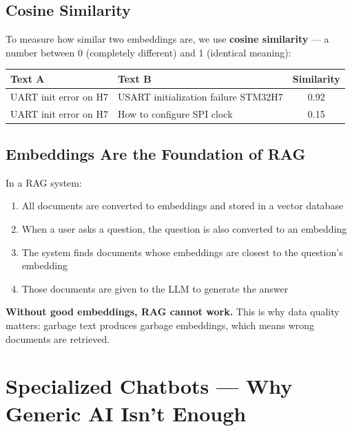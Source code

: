 \documentclass[11pt,a4paper]{report}
\begin{document}
\section{Cosine Similarity}

To measure how similar two embeddings are, we use \textbf{cosine similarity} --- a number between 0 (completely different) and 1 (identical meaning):

\begin{table}[h]
\centering
\begin{tabularx}{\textwidth}{X X c}
\toprule
\textbf{Text A} & \textbf{Text B} & \textbf{Similarity} \\
\midrule
UART init error on H7 & USART initialization failure STM32H7 & 0.92 \\
UART init error on H7 & How to configure SPI clock & 0.15 \\
\bottomrule
\end{tabularx}
\end{table}

\section{Embeddings Are the Foundation of RAG}

In a RAG system:
\begin{enumerate}
    \item All documents are converted to embeddings and stored in a vector database
    \item When a user asks a question, the question is also converted to an embedding
    \item The system finds documents whose embeddings are closest to the question's embedding
    \item Those documents are given to the LLM to generate the answer
\end{enumerate}

\textbf{Without good embeddings, RAG cannot work.} This is why data quality matters: garbage text produces garbage embeddings, which means wrong documents are retrieved.

\chapter{Specialized Chatbots --- Why Generic AI Isn't Enough}
\end{document}
